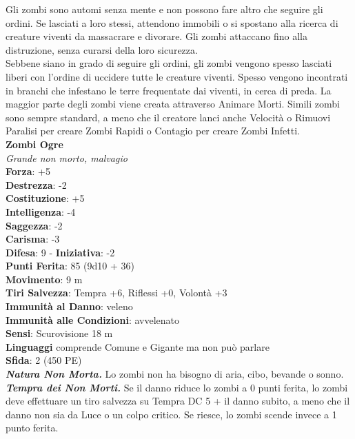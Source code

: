 \begin{multicols}{2}
Gli zombi sono automi senza mente e non possono fare altro che seguire gli ordini. Se lasciati a loro stessi, attendono immobili o si spostano alla ricerca di creature viventi da massacrare e divorare. Gli zombi attaccano fino alla distruzione, senza curarsi della loro sicurezza.\\

Sebbene siano in grado di seguire gli ordini, gli zombi vengono spesso lasciati liberi con l'ordine di uccidere tutte le creature viventi. Spesso vengono incontrati in branchi che infestano le terre frequentate dai viventi, in cerca di preda. La maggior parte degli zombi viene creata attraverso Animare Morti. Simili zombi sono sempre standard, a meno che il creatore lanci anche Velocità o Rimuovi Paralisi per creare Zombi Rapidi o Contagio per creare Zombi Infetti.\\

\medskip\textbf{Zombi Ogre}\\
\emph{Grande non morto, malvagio}\\
\textbf{Forza}: +5\\
\textbf{Destrezza}: -2\\
\textbf{Costituzione}: +5\\
\textbf{Intelligenza}: -4\\
\textbf{Saggezza}: -2\\
\textbf{Carisma}: -3\\
\textbf{Difesa}: 9 - \textbf{Iniziativa}: -2\\
\textbf{Punti Ferita}: 85 (9d10 + 36)\\
\textbf{Movimento}: 9 m\\
\textbf{Tiri Salvezza}: Tempra +6, Riflessi +0, Volontà +3\\
\textbf{Immunità al Danno}: veleno\\
\textbf{Immunità alle Condizioni}: avvelenato\\
\textbf{Sensi}: Scurovisione 18 m\\
\textbf{Linguaggi} comprende Comune e Gigante ma non può parlare\\
\textbf{Sfida}: 2 (450 PE)\smallskip\\
\emph{\textbf{Natura Non Morta.}} Lo zombi non ha bisogno di aria, cibo, bevande o sonno.\\
\emph{\textbf{Tempra dei Non Morti.}} Se il danno riduce lo zombi a 0 punti ferita, lo zombi deve effettuare un tiro salvezza su Tempra DC 5 + il danno subito, a meno che il danno non sia da Luce o un colpo critico. Se riesce, lo zombi scende invece a 1 punto ferita.\\


\end{multicols}
